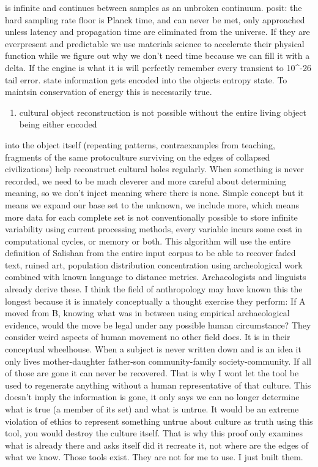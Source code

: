 is infinite and continues between samples as an unbroken continuum. posit: the hard sampling rate floor is Planck time, and can never be met, only approached unless latency and propagation time are eliminated from the universe. If they are everpresent and predictable we use materials science to accelerate their physical function while we figure out why we don't need time because we can fill it with a delta. If the engine is what it is will perfectly remember every transient to 10\textasciicircum{}-26 tail error. state information gets encoded into the objects entropy state. To maintsin conservation of energy this is necessarily true.


\begin{enumerate}
\item cultural object reconstruction is not possible without the entire living object being either encoded
\end{enumerate}

into the object itself (repeating patterns, contraexamples from teaching, fragments of the same protoculture surviving on the edges of collapsed civilizations) help reconstruct cultural holes regularly. When something is never recorded, we need to be much cleverer and more careful about determining meaning, so we don't inject meaning where there is none. Simple concept but it means we expand our base set to the unknown, we include more, which means more data for each complete set is not conventionally possible to store infinite variability using current processing methods, every variable incurs some cost in computational cycles, or memory or both. This algorithm will use the entire definition of Salishan from the entire input corpus to be able to recover faded text, ruined art, population distribution concentration using archeological work combined with known language to distance metrics. Archaeologists and linguists already derive these. I think the field of anthropology may have known this the longest because it is innately conceptually a thought exercise they perform: If A moved from B, knowing what was in between using empirical archaeological evidence, would the move be legal under any possible human circumstance? They consider weird aspects of human movement no other field does. It is in their conceptual wheelhouse. When a subject is never written down and is an idea it only lives mother-daughter father-son community-family society-community. If all of those are gone it can never be recovered. That is why I wont let the tool be used to regenerate anything without a human representative of that culture. This doesn't imply the information is gone, it only says we can no longer determine what is true (a member of its set) and what is untrue. It would be an extreme violation of ethics to represent something untrue about culture as truth using this tool, you would destroy the culture itself. That is why this proof only examines what is already there and asks itself did it recreate it, not where are the edges of what we know. Those tools exist. They are not for me to use. I just built them.
